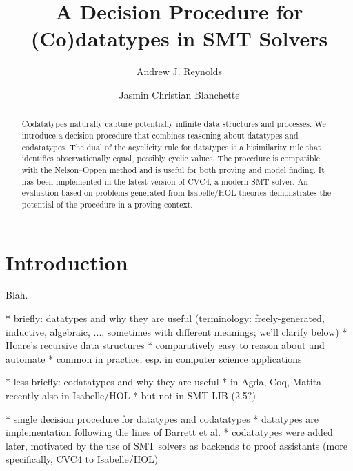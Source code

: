 \documentclass[a4paper,oribibl,envcountsame,draft]{llncs}
\begin{document}
\title{A Decision Procedure for (Co)datatypes in SMT Solvers}

\author {Andrew J. Reynolds \and Jasmin Christian Blanchette}

\maketitle

\begin{abstract}
Codatatypes naturally capture potentially infinite data structures and
processes. We introduce a decision procedure that combines reasoning about
datatypes and codatatypes. The dual of the acyclicity rule for datatypes is a
bisimilarity rule that identifies observationally equal, possibly cyclic
values. The procedure is compatible with the Nelson--Oppen method
and is useful for both proving and model finding. It has been implemented in the
latest version of CVC4, a modern SMT solver. An evaluation based on problems
generated from Isabelle/HOL theories demonstrates the potential of the procedure
in a proving context.
\end{abstract}

\setcounter{footnote}{0}

\section{Introduction}
\label{sec:introduction}

Blah.

  * briefly: datatypes and why they are useful
    (terminology: freely-generated, inductive, algebraic, ..., sometimes
    with different meanings; we'll clarify below)
    * Hoare's recursive data structures
    * comparatively easy to reason about and automate
    * common in practice, esp. in computer science applications

  * less briefly: codatatypes and why they are useful
    * in Agda, Coq, Matita -- recently also in Isabelle/HOL
    * but not in SMT-LIB (2.5?)

  * single decision procedure for datatypes and codatatypes
  * datatypes are implementation following the lines of Barrett et al.
  * codatatypes were added later, motivated by the use of SMT solvers as
    backends to proof assistants (more specifically, CVC4 to Isabelle/HOL)
\end{document}
